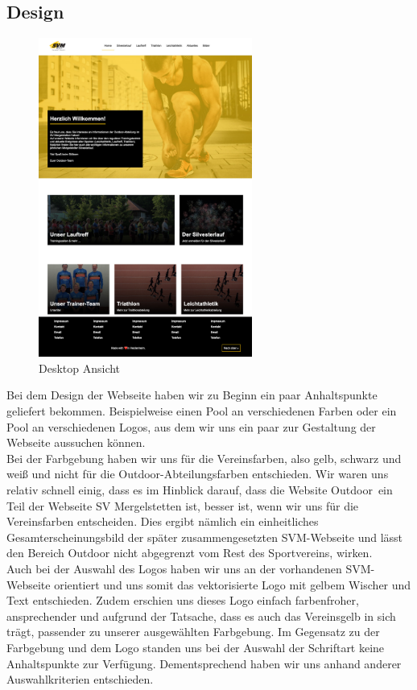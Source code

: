 \documentclass[12pt,a4paper]{article}
\begin{document}
\subsection{Design}
\begin{figure}
  \includegraphics[width=7cm]{Home_Outdoor.jpg}
  \caption{Desktop Ansicht}
\end{figure}Bei dem Design der Webseite haben wir zu Beginn ein paar Anhaltspunkte geliefert bekommen. Beispielweise einen Pool an verschiedenen Farben oder ein Pool an verschiedenen Logos, aus dem wir uns ein paar zur Gestaltung der Webseite aussuchen können.\\
Bei der Farbgebung haben wir uns für die Vereinsfarben, also gelb, schwarz und weiß und nicht für die Outdoor-Abteilungsfarben entschieden. Wir waren uns relativ schnell einig, dass es im Hinblick darauf, dass die Website \dq Outdoor\dq \ ein Teil der Webseite  SV Mergelstetten ist, besser ist, wenn wir uns für die Vereinsfarben entscheiden. Dies ergibt nämlich ein einheitliches Gesamterscheinungsbild der später zusammengesetzten SVM-Webseite und lässt den Bereich Outdoor nicht abgegrenzt vom Rest des Sportvereins, wirken.\\
Auch bei der Auswahl des Logos haben wir uns an der vorhandenen SVM-Webseite orientiert und uns somit das vektorisierte Logo mit gelbem Wischer und Text entschieden. Zudem erschien uns dieses Logo einfach farbenfroher, ansprechender und aufgrund der Tatsache, dass es auch das Vereinsgelb in sich trägt, passender zu unserer ausgewählten Farbgebung.
Im Gegensatz zu der Farbgebung und dem Logo standen uns bei der Auswahl der Schriftart keine Anhaltspunkte zur Verfügung. Dementsprechend haben wir uns anhand anderer Auswahlkriterien entschieden. \\
\end{document}
